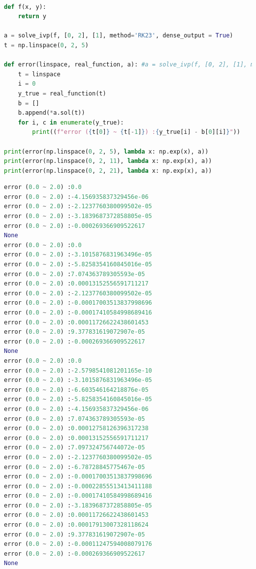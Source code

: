 \documentclass[11pt]{article}
\begin{document}
\begin{lstlisting}[language=Python]

def f(x, y):
    return y 

a = solve_ivp(f, [0, 2], [1], method='RK23', dense_output = True)
t = np.linspace(0, 2, 5)

def error(linspace, real_function, a): #a = solve_ivp(f, [0, 2], [1], method='RK45', dense_output = True)
    t = linspace
    i = 0
    y_true = real_function(t)
    b = []
    b.append(*a.sol(t))
    for i, c in enumerate(y_true):
        print((f"error ({t[0]} ~ {t[-1]}) :{y_true[i] - b[0][i]}"))
        
print(error(np.linspace(0, 2, 5), lambda x: np.exp(x), a))
print(error(np.linspace(0, 2, 11), lambda x: np.exp(x), a))
print(error(np.linspace(0, 2, 21), lambda x: np.exp(x), a))
\end{lstlisting}

\begin{lstlisting}[language=Python]
error (0.0 ~ 2.0) :0.0
error (0.0 ~ 2.0) :-4.156935837329456e-06
error (0.0 ~ 2.0) :-2.1237760380099502e-05
error (0.0 ~ 2.0) :-3.1839687372858805e-05
error (0.0 ~ 2.0) :-0.000269366909522617
None
error (0.0 ~ 2.0) :0.0
error (0.0 ~ 2.0) :-3.1015876831963496e-05
error (0.0 ~ 2.0) :-5.8258354160845016e-05
error (0.0 ~ 2.0) :7.074363789305593e-05
error (0.0 ~ 2.0) :0.00013152556591711217
error (0.0 ~ 2.0) :-2.1237760380099502e-05
error (0.0 ~ 2.0) :-0.00017003513837998696
error (0.0 ~ 2.0) :-0.00017410584998689416
error (0.0 ~ 2.0) :0.00011726622438601453
error (0.0 ~ 2.0) :9.377831619072907e-05
error (0.0 ~ 2.0) :-0.000269366909522617
None
error (0.0 ~ 2.0) :0.0
error (0.0 ~ 2.0) :-2.5798541081201165e-10
error (0.0 ~ 2.0) :-3.1015876831963496e-05
error (0.0 ~ 2.0) :-6.603546164218876e-05
error (0.0 ~ 2.0) :-5.8258354160845016e-05
error (0.0 ~ 2.0) :-4.156935837329456e-06
error (0.0 ~ 2.0) :7.074363789305593e-05
error (0.0 ~ 2.0) :0.00012758126396317238
error (0.0 ~ 2.0) :0.00013152556591711217
error (0.0 ~ 2.0) :7.097324756744072e-05
error (0.0 ~ 2.0) :-2.1237760380099502e-05
error (0.0 ~ 2.0) :-6.78728845775467e-05
error (0.0 ~ 2.0) :-0.00017003513837998696
error (0.0 ~ 2.0) :-0.00022855513413411188
error (0.0 ~ 2.0) :-0.00017410584998689416
error (0.0 ~ 2.0) :-3.1839687372858805e-05
error (0.0 ~ 2.0) :0.00011726622438601453
error (0.0 ~ 2.0) :0.00017913007328118624
error (0.0 ~ 2.0) :9.377831619072907e-05
error (0.0 ~ 2.0) :-0.00011247594008079176
error (0.0 ~ 2.0) :-0.000269366909522617
None
\end{lstlisting}
\end{document}
